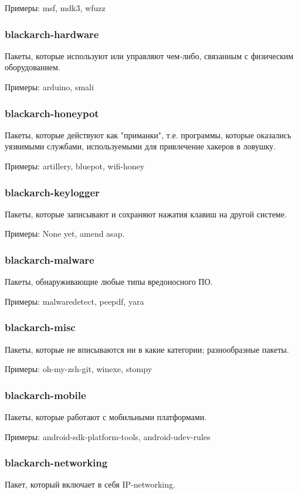 \documentclass[a4paper, oneside, 11pt]{book}
\begin{document}
Примеры: msf, mdk3, wfuzz

\subsubsection{blackarch-hardware}
Пакеты, которые используют или управляют чем-либо, связанным
с физическим оборудованием.

Примеры: arduino, smali

\subsubsection{blackarch-honeypot}
Пакеты, которые действуют как "приманки", т.е. программы, которые
оказались уязвимыми службами, используемыми для привлечение
хакеров в ловушку.

Примеры: artillery, bluepot, wifi-honey

\subsubsection{blackarch-keylogger}
Пакеты, которые записывают и сохраняют нажатия клавиш на другой системе.

Примеры: None yet, amend asap.

\subsubsection{blackarch-malware}
Пакеты, обнаруживающие любые типы вредоносного ПО.

Примеры: malwaredetect, peepdf, yara

\subsubsection{blackarch-misc}
Пакеты, которые не вписываются ни в какие категории; разнообразные пакеты.

Примеры: oh-my-zsh-git, winexe, stompy

\subsubsection{blackarch-mobile}
Пакеты, которые работают с мобильными платформами.

Примеры: android-sdk-platform-tools, android-udev-rules

\subsubsection{blackarch-networking}
Пакет, который включает в себя IP-networking.
\end{document}
